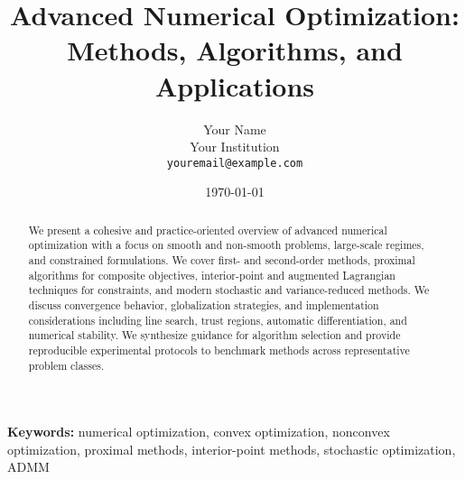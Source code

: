 \documentclass[12pt]{article}
\title{Advanced Numerical Optimization: Methods, Algorithms, and Applications}
\author{Your Name \\ Your Institution \\ \texttt{youremail@example.com}}
\date{\today}
\begin{document}
\maketitle

\begin{abstract}
We present a cohesive and practice-oriented overview of advanced numerical optimization with a focus on smooth and non-smooth problems, large-scale regimes, and constrained formulations. We cover first- and second-order methods, proximal algorithms for composite objectives, interior-point and augmented Lagrangian techniques for constraints, and modern stochastic and variance-reduced methods. We discuss convergence behavior, globalization strategies, and implementation considerations including line search, trust regions, automatic differentiation, and numerical stability. We synthesize guidance for algorithm selection and provide reproducible experimental protocols to benchmark methods across representative problem classes.
\end{abstract}

\noindent\textbf{Keywords:} numerical optimization, convex optimization, nonconvex optimization, proximal methods, interior-point methods, stochastic optimization, ADMM










\clearpage
{\small}

\clearpage
\appendix

\end{document}
